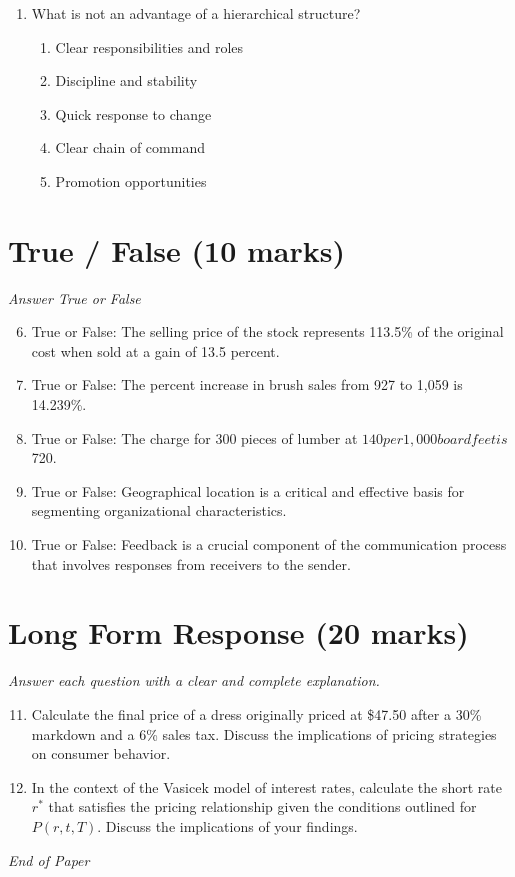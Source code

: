 \documentclass[12pt]{article}
\begin{document}
\begin{enumerate}[label=\arabic*.]
\begin{enumerate}[label=(\alph*)]
    \item \$2,128.64
    \item \$2,080.00
    \item \$2,081.60
    \item \$2,200.00
    \item \$2,100.00
\end{enumerate}
\item What is not an advantage of a hierarchical structure?
\begin{enumerate}[label=(\alph*)]
    \item Clear responsibilities and roles
    \item Discipline and stability
    \item Quick response to change
    \item Clear chain of command
    \item Promotion opportunities
\end{enumerate}
\end{enumerate}

\section*{True / False (10 marks)}
\textit{Answer True or False}
\begin{enumerate}[label=\arabic*.]
\setcounter{enumi}{5}
\item True or False: The selling price of the stock represents 113.5\% of the original cost when sold at a gain of 13.5 percent.
\item True or False: The percent increase in brush sales from 927 to 1,059 is 14.239\%.
\item True or False: The charge for 300 pieces of lumber at $140 per 1,000 board feet is $720.
\item True or False: Geographical location is a critical and effective basis for segmenting organizational characteristics.
\item True or False: Feedback is a crucial component of the communication process that involves responses from receivers to the sender.
\end{enumerate}

\section*{Long Form Response (20 marks)}
\textit{Answer each question with a clear and complete explanation.}
\begin{enumerate}[label=\arabic*.]
\setcounter{enumi}{10}
\item Calculate the final price of a dress originally priced at \$47.50 after a 30\% markdown and a 6\% sales tax. Discuss the implications of pricing strategies on consumer behavior.
\item In the context of the Vasicek model of interest rates, calculate the short rate \( r^* \) that satisfies the pricing relationship given the conditions outlined for \( P(r,t,T) \). Discuss the implications of your findings.
\end{enumerate}

\vfill
\noindent\textit{End of Paper}
\end{document}
